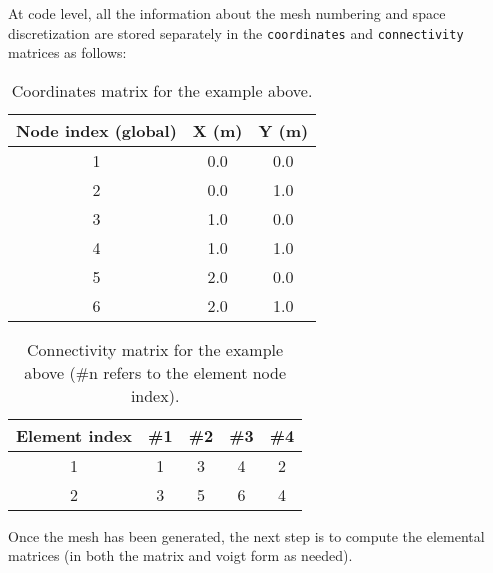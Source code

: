 At code level, all the information about the mesh numbering and space discretization are stored separately in the \texttt{coordinates} and \texttt{connectivity} matrices as follows:

\begin{table}[H]
    \centering
    \begin{tabular}{|c|cc|}
        \hline
        \textbf{Node index (global)} & \textbf{X (m)} & \textbf{Y (m)} \\
        \hline
        1                            & 0.0            & 0.0            \\
        2                            & 0.0            & 1.0            \\
        3                            & 1.0            & 0.0            \\
        4                            & 1.0            & 1.0            \\
        5                            & 2.0            & 0.0            \\
        6                            & 2.0            & 1.0            \\
        \hline
    \end{tabular}
    \caption{Coordinates matrix for the example above.}
    \label{tab:coordinates}
\end{table}

\begin{table}[H]
    \centering
    \begin{tabular}{|c|cccc|}
        \hline
        \textbf{Element index} & \textbf{\#1} & \textbf{\#2} & \textbf{\#3} & \textbf{\#4} \\
        \hline
        1                      & 1            & 3            & 4            & 2            \\
        2                      & 3            & 5            & 6            & 4            \\
        \hline
    \end{tabular}
    \caption{Connectivity matrix for the example above (\#n refers to the element node index).}
    \label{tab:connectivity}
\end{table}

Once the mesh has been generated, the next step is to compute the elemental matrices (in both the matrix and voigt form as needed).

